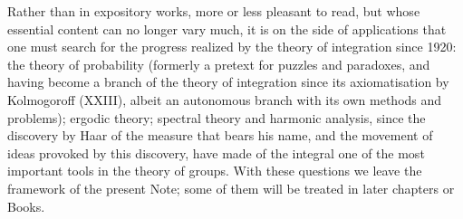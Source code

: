 Rather than in expository works, more or less pleasant to read, but whose essential content can no longer vary much, it is on the side of applications that one must search for the progress realized by the theory of integration since 1920: the theory of probability (formerly a pretext for puzzles and paradoxes, and having become a branch of the theory of integration since its axiomatisation by Kolmogoroff (XXIII), albeit an autonomous branch with its own methods and problems); ergodic theory; spectral theory and harmonic analysis, since the discovery by Haar of the measure that bears his name, and the movement of ideas provoked by this discovery, have made of the integral one of the most important tools in the theory of groups. With these questions we leave the framework of the present Note; some of them will be treated in later chapters or Books.

